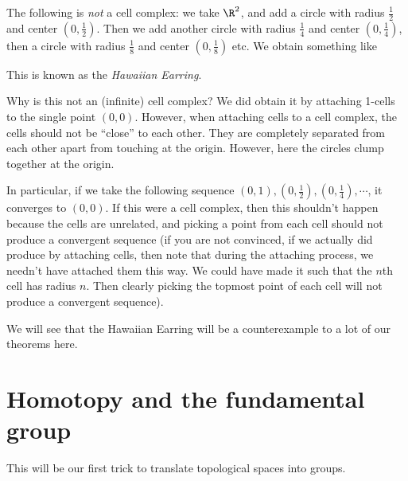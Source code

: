 \documentclass[a4paper]{article}
\begin{document}
\begin{eg}
  The following is \emph{not} a cell complex: we take $\R^2$, and add a circle with radius $\frac{1}{2}$ and center $(0, \frac{1}{2})$. Then we add another circle with radius $\frac{1}{4}$ and center $(0, \frac{1}{4})$, then a circle with radius $\frac{1}{8}$ and center $(0, \frac{1}{8})$ etc. We obtain something like
  \begin{center}
  \end{center}
  This is known as the \emph{Hawaiian Earring}.

  Why is this not an (infinite) cell complex? We did obtain it by attaching 1-cells to the single point $(0, 0)$. However, when attaching cells to a cell complex, the cells should not be ``close'' to each other. They are completely separated from each other apart from touching at the origin. However, here the circles clump together at the origin.

  In particular, if we take the following sequence $(0, 1), (0, \frac{1}{2}), (0, \frac{1}{4}), \cdots$, it converges to $(0, 0)$. If this were a cell complex, then this shouldn't happen because the cells are unrelated, and picking a point from each cell should not produce a convergent sequence (if you are not convinced, if we actually did produce by attaching cells, then note that during the attaching process, we needn't have attached them this way. We could have made it such that the $n$th cell has radius $n$. Then clearly picking the topmost point of each cell will not produce a convergent sequence).

  We will see that the Hawaiian Earring will be a counterexample to a lot of our theorems here.
\end{eg}

\section{Homotopy and the fundamental group}
This will be our first trick to translate topological spaces into groups.
\end{document}
